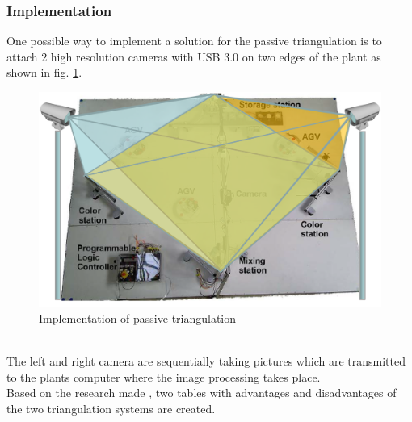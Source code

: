 \subsubsection*{Implementation} 
One possible way to implement a solution for the passive triangulation is to attach 2 high resolution cameras with USB 3.0 on two edges of the plant as shown in fig. \ref{ativeTriangulationimplementation}.\\
\begin{figure}[!htbp]
	\centering
	\includegraphics[width = 16cm]{Pictures/triangulationimplementatio}
	\caption{Implementation of passive triangulation}
	\label{ativeTriangulationimplementation}
\end{figure}\\%
The left and right camera are sequentially taking pictures which are transmitted to the plants computer where the image processing takes place.\\ 
\pagebreak
Based on the research made , two tables with advantages and disadvantages of the two triangulation systems are created.
